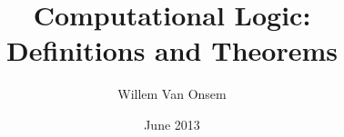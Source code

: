 \documentclass[a4paper]{article}
\title{Computational Logic:\\Definitions and Theorems}
\author{Willem Van Onsem}
\date{June 2013}
\begin{document}
\maketitle
\tableofcontents





\theindex
\end{document}
